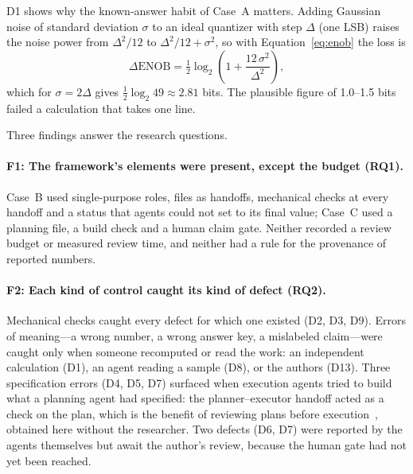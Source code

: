 D1 shows why the known-answer habit of Case~A matters. Adding Gaussian noise of standard
deviation $\sigma$ to an ideal quantizer with step $\Delta$ (one LSB) raises the noise power from
$\Delta^2/12$ to $\Delta^2/12+\sigma^2$, so with Equation~\eqref{eq:enob} the loss is
\begin{equation}
  \Delta\mathrm{ENOB} = \tfrac{1}{2}\log_2\!\left(1+\frac{12\,\sigma^2}{\Delta^2}\right),
  \label{eq:enob-drop}
\end{equation}
which for $\sigma=2\Delta$ gives $\tfrac12\log_2 49\approx2.81$ bits. The plausible
figure of 1.0--1.5 bits failed a calculation that takes one line.

Three findings answer the research questions.

\paragraph{F1: The framework's elements were present, except the budget (RQ1).} Case~B
used single-purpose roles, files as handoffs, mechanical checks at every handoff and a
status that agents could not set to its final value; Case~C used a planning file, a build
check and a human claim gate. Neither recorded a review budget or measured review time,
and neither had a rule for the provenance of reported numbers.

\paragraph{F2: Each kind of control caught its kind of defect (RQ2).} Mechanical checks
caught every defect for which one existed (D2, D3, D9). Errors of meaning---a wrong
number, a wrong answer key, a mislabeled claim---were caught only when someone recomputed
or read the work: an independent calculation (D1), an agent reading a sample (D8), or the
authors (D13). Three specification errors (D4, D5, D7)
surfaced when execution agents tried to build what a planning agent had specified: the
planner--executor handoff acted as a check on the plan, which is the benefit of reviewing
plans before execution~\cite{shen2023hugginggpt,schluntz2024building}, obtained here
without the researcher. Two defects (D6, D7) were reported by the agents themselves but
await the author's review, because the human gate had not yet been reached.

